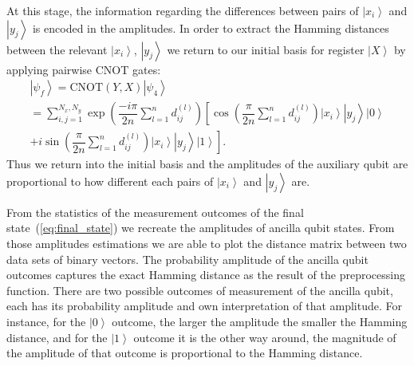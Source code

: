 \documentclass[pra,showkeys,twocolumn,showpacs]{revtex4-1}
\begin{document}
At this stage, the information regarding the differences between pairs of $\left| x_i \right\rangle$ and $\left| y_j \right\rangle$ is encoded in the amplitudes. In order to extract the Hamming distances between the relevant $\left| x_i \right\rangle$, $\left| y_j \right\rangle$ we return to our initial basis for register $\left| X \right\rangle$ by applying pairwise CNOT gates:
%
\begin{multline}
		\label{eq:final_state}
    \left| \psi_f \right\rangle =
    \mathrm{CNOT} (Y,X)\left| \psi_4 \right\rangle \\=
    \sum\limits_{i, j=1}^{N_x,N_y}
    \exp \left(\dfrac{-i \pi}{2n}\sum\limits_{l=1}^n d^{(l)}_{ij} \right)
				\left[ \cos\left(\dfrac{\pi}{2n}\sum\limits_{l=1}^n d^{(l)}_{ij} \right)
        \left| x_i \right\rangle
        \left| y_j \right\rangle
        \left| 0 \right\rangle\right.
        \\+
        \left. i \sin\left(\dfrac{\pi}{2n}\sum\limits_{l=1}^n d^{(l)}_{ij} \right)
        \left| x_i \right\rangle
        \left| y_j \right\rangle
        \left| 1 \right\rangle\right] .
\end{multline}
%
Thus we return into the initial basis and the amplitudes of the auxiliary qubit are proportional to how different each pairs of $\left| x_i \right\rangle$ and $\left| y_j \right\rangle$ are.

From the statistics of the measurement outcomes of the final state~(\ref{eq:final_state}) we recreate the amplitudes of ancilla qubit states.
From those amplitudes estimations we are able to plot the distance matrix between two data sets of binary vectors.
The probability amplitude of the ancilla qubit outcomes captures the exact Hamming distance as the result of the preprocessing function.
There are two possible outcomes of measurement of the ancilla qubit, each has its probability amplitude and own interpretation of that amplitude.
For instance, for the $\left| 0 \right\rangle$ outcome, the larger the amplitude the smaller the Hamming distance,
and for the $\left| 1 \right\rangle$ outcome it is the other way around, the magnitude of the amplitude of that outcome is proportional to the Hamming distance.
\end{document}
